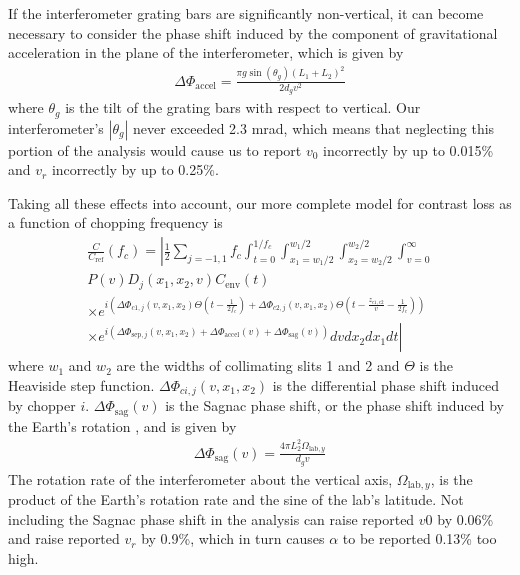 \documentclass[twocolumn,prl,showpacs,superscriptaddress]{revtex4-1}   %
\newcommand{\Omegalab}{\Omega_{\mathrm{lab},y}}
\newcommand{\dphisepj}{\Delta\Phi_{\mathrm{sep},j}}
\newcommand{\dphisag}{\Delta\Phi_{\mathrm{sag}}}
\newcommand{\dphiaccel}{\Delta\Phi_{\mathrm{accel}}}
\newcommand{\cenv}{C_{\mathrm{env}}}
\begin{document}
If the interferometer grating bars are significantly non-vertical, it can become necessary to consider the phase shift induced by the component of gravitational acceleration in the plane of the interferometer, which is given by
\begin{align}
	\dphiaccel = \frac{\pi g\sin({\theta_g})(L_1+L_2)^2}{2d_g v^2}
	\label{phiAccel}
\end{align}
where $\theta_g$ is the tilt of the grating bars with respect to vertical. 
Our interferometer's $|\theta_g|$ never exceeded 2.3 mrad, which means that neglecting this portion of the analysis would cause us to report $v_0$ incorrectly by up to 0.015\% and $v_r$ incorrectly by up to 0.25\%.

Taking all these effects into account, our more complete model for contrast loss as a function of chopping frequency is
\begin{align}
	\frac{C}{C_{\mathrm{ref}}}(f_c) = 
	\left|
		\frac{1}{2} \sum_{j=-1,1}
		f_c \int_{t=0}^{1/f_c} 
		\int_{x_1=w_1/2}^{w_1/2}
		\int_{x_2=w_2/2}^{w_2/2}
		\int_{v=0}^{\infty}           
		\right. \nonumber \\
		P(v)
		D_j(x_1, x_2, v)
		\cenv(t)                   
		\nonumber \\ \times
		e^{i\left( \Delta\Phi_{c1,j}(v,x_1,x_2)\Theta\left(t-\frac{1}{2f_c}\right) + \Delta\Phi_{c2,j}(v,x_1,x_2)\Theta\left(t-\frac{z_{c1,c2}}{v}-\frac{1}{2f_c}\right) \right)}
		\nonumber \\ \times \left.
		e^{i( \dphisepj(v,x_1,x_2) + \dphiaccel(v) + \dphisag(v) )}
		dv dx_{2} dx_{1} dt
	\right|
	\label{CvCF}
\end{align}
where $w_1$ and $w_2$ are the widths of collimating slits 1 and 2 and $\Theta$ is the Heaviside step function.
$\Delta\Phi_{ci,j}(v,x_1,x_2)$ is the differential phase shift induced by chopper $i$.
$\dphisag(v)$ is the Sagnac phase shift, or the phase shift induced by the Earth's rotation \cite{Lenef1997,Jacquey2008}, and is given by
\begin{align}
	\dphisag(v) = \frac{4\pi L_2^2\Omegalab}{d_g v}
	\label{phiSag}
\end{align}
The rotation rate of the interferometer about the vertical axis, $\Omegalab$, is the product of the Earth's rotation rate and the sine of the lab's latitude. Not including the Sagnac phase shift in the analysis can raise reported $v0$ by 0.06\% and raise reported $v_r$ by 0.9\%, which in turn causes $\alpha$ to be reported 0.13\% too high.
\end{document}

